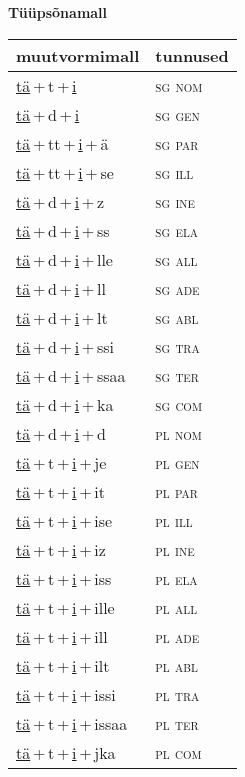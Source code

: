 
\vspace{1.8em}
\begin{minipage}{\textwidth}
\textbf{Tüüpsõnamall \,}\\

\begin{sideways}
\begin{tabular}{l l}
muutvormimall & tunnused \\
\hline
\underline{tä}\,+\,t\,+\,\underline{i} & \textsc{ sg nom } \\
\underline{tä}\,+\,d\,+\,\underline{i} & \textsc{ sg gen } \\
\underline{tä}\,+\,tt\,+\,\underline{i}\,+\,ä & \textsc{ sg par } \\
\underline{tä}\,+\,tt\,+\,\underline{i}\,+\,se & \textsc{ sg ill } \\
\underline{tä}\,+\,d\,+\,\underline{i}\,+\,z & \textsc{ sg ine } \\
\underline{tä}\,+\,d\,+\,\underline{i}\,+\,ss & \textsc{ sg ela } \\
\underline{tä}\,+\,d\,+\,\underline{i}\,+\,lle & \textsc{ sg all } \\
\underline{tä}\,+\,d\,+\,\underline{i}\,+\,ll & \textsc{ sg ade } \\
\underline{tä}\,+\,d\,+\,\underline{i}\,+\,lt & \textsc{ sg abl } \\
\underline{tä}\,+\,d\,+\,\underline{i}\,+\,ssi & \textsc{ sg tra } \\
\underline{tä}\,+\,d\,+\,\underline{i}\,+\,ssaa & \textsc{ sg ter } \\
\underline{tä}\,+\,d\,+\,\underline{i}\,+\,ka & \textsc{ sg com } \\
\underline{tä}\,+\,d\,+\,\underline{i}\,+\,d & \textsc{ pl nom } \\
\underline{tä}\,+\,t\,+\,\underline{i}\,+\,je & \textsc{ pl gen } \\
\underline{tä}\,+\,t\,+\,\underline{i}\,+\,it & \textsc{ pl par } \\
\underline{tä}\,+\,t\,+\,\underline{i}\,+\,ise & \textsc{ pl ill } \\
\underline{tä}\,+\,t\,+\,\underline{i}\,+\,iz & \textsc{ pl ine } \\
\underline{tä}\,+\,t\,+\,\underline{i}\,+\,iss & \textsc{ pl ela } \\
\underline{tä}\,+\,t\,+\,\underline{i}\,+\,ille & \textsc{ pl all } \\
\underline{tä}\,+\,t\,+\,\underline{i}\,+\,ill & \textsc{ pl ade } \\
\underline{tä}\,+\,t\,+\,\underline{i}\,+\,ilt & \textsc{ pl abl } \\
\underline{tä}\,+\,t\,+\,\underline{i}\,+\,issi & \textsc{ pl tra } \\
\underline{tä}\,+\,t\,+\,\underline{i}\,+\,issaa & \textsc{ pl ter } \\
\underline{tä}\,+\,t\,+\,\underline{i}\,+\,jka & \textsc{ pl com } \\
\end{tabular}
\end{sideways}
\label{tab:tüüpsõnamall-täti}


\end{minipage}
